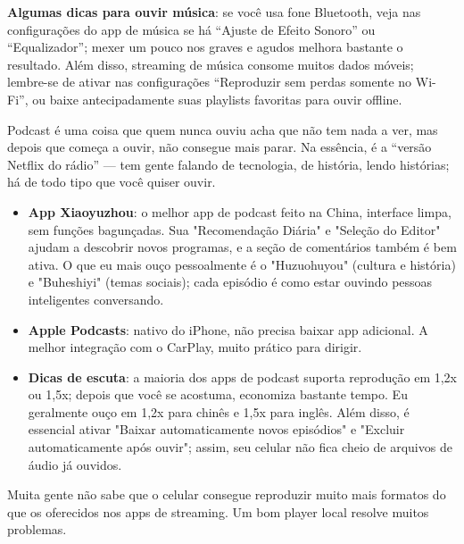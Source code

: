 \textbf{Algumas dicas para ouvir música}: se você usa fone Bluetooth, veja nas configurações do app de música se há “Ajuste de Efeito Sonoro” ou “Equalizador”; mexer um pouco nos graves e agudos melhora bastante o resultado. Além disso, streaming de música consome muitos dados móveis; lembre-se de ativar nas configurações “Reproduzir sem perdas somente no Wi-Fi”, ou baixe antecipadamente suas playlists favoritas para ouvir offline.


Podcast é uma coisa que quem nunca ouviu acha que não tem nada a ver, mas depois que começa a ouvir, não consegue mais parar. Na essência, é a “versão Netflix do rádio” — tem gente falando de tecnologia, de história, lendo histórias; há de todo tipo que você quiser ouvir.

\begin{itemize}
  \item \textbf{App Xiaoyuzhou}: o melhor app de podcast feito na China, interface limpa, sem funções bagunçadas. Sua "Recomendação Diária" e "Seleção do Editor" ajudam a descobrir novos programas, e a seção de comentários também é bem ativa. O que eu mais ouço pessoalmente é o "Huzuohuyou" (cultura e história) e "Buheshiyi" (temas sociais); cada episódio é como estar ouvindo pessoas inteligentes conversando.
  \item \textbf{Apple Podcasts}: nativo do iPhone, não precisa baixar app adicional. A melhor integração com o CarPlay, muito prático para dirigir.
  \item \textbf{Dicas de escuta}: a maioria dos apps de podcast suporta reprodução em 1,2x ou 1,5x; depois que você se acostuma, economiza bastante tempo. Eu geralmente ouço em 1,2x para chinês e 1,5x para inglês. Além disso, é essencial ativar "Baixar automaticamente novos episódios" e "Excluir automaticamente após ouvir"; assim, seu celular não fica cheio de arquivos de áudio já ouvidos.
\end{itemize}


Muita gente não sabe que o celular consegue reproduzir muito mais formatos do que os oferecidos nos apps de streaming. Um bom player local resolve muitos problemas.

